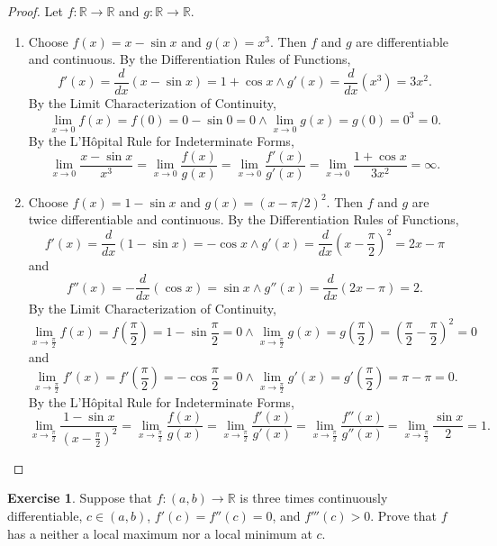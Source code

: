 \documentclass[12pt]{article}
\theoremstyle{definition}
\newtheorem{exercise}{Exercise}
\begin{document}
\begin{proof}
    Let \(f : \mathbb{R} \to \mathbb{R}\) and \(g : \mathbb{R} \to \mathbb{R}\).
    \begin{enumerate}[label=(\alph*)]
        \item Choose \(f(x) = x - \sin x\) and \(g(x) = x^3\). Then \(f\) and \(g\) are differentiable and continuous. By the Differentiation Rules of Functions,
        \[
            f'(x) = \frac{d}{dx}(x - \sin x) = 1 + \cos x \land g'(x) = \frac{d}{dx}(x^3) = 3x^2.
        \]
        By the Limit Characterization of Continuity,
        \[
            \lim_{x \to 0}f(x) = f(0) = 0 - \sin 0 = 0 \land \lim_{x \to 0}g(x) = g(0) = 0^3 = 0. 
        \]
        By the L'Hôpital Rule for Indeterminate Forms,
        \[
            \lim_{x \to 0}\frac{x - \sin x}{x^3} = \lim_{x \to 0}\frac{f(x)}{g(x)} = \lim_{x \to 0}\frac{f'(x)}{g'(x)} = \lim_{x \to 0}\frac{1 + \cos x}{3x^2} = \infty.
        \]
        \item Choose \(f(x) = 1 - \sin x\) and \(g(x) = (x - \pi/2)^2\). Then \(f\) and \(g\) are twice differentiable and continuous. By the Differentiation Rules of Functions,
        \[
            f'(x) = \frac{d}{dx}(1 - \sin x) = -\cos x \land g'(x) = \frac{d}{dx}\left(x - \frac{\pi}{2}\right)^2 = 2x - \pi
        \]
        and 
        \[
            f''(x) = -\frac{d}{dx}(\cos x) = \sin x \land g''(x) = \frac{d}{dx}(2x - \pi) = 2.
        \]
        By the Limit Characterization of Continuity,
        \[
            \lim_{x \to \frac{\pi}{2}}f(x) = f\left(\frac{\pi}{2}\right) = 1 - \sin \frac{\pi}{2} = 0 \land \lim_{x \to \frac{\pi}{2}}g(x) = g\left(\frac{\pi}{2}\right) = \left(\frac{\pi}{2} - \frac{\pi}{2}\right)^2 = 0
        \]
        and 
        \[
            \lim_{x \to \frac{\pi}{2}}f'(x) = f'\left(\frac{\pi}{2}\right) = -\cos \frac{\pi}{2} = 0 \land \lim_{x \to \frac{\pi}{2}}g'(x) = g'\left(\frac{\pi}{2}\right) = \pi - \pi = 0.
        \]
        By the L'Hôpital Rule for Indeterminate Forms,
        \[
            \lim_{x \to \frac{\pi}{2}}\frac{1 - \sin x}{(x - \frac{\pi}{2})^2} = \lim_{x \to \frac{\pi}{2}}\frac{f(x)}{g(x)} = \lim_{x \to \frac{\pi}{2}}\frac{f'(x)}{g'(x)} = \lim_{x \to \frac{\pi}{2}}\frac{f''(x)}{g''(x)} = \lim_{x \to \frac{\pi}{2}}\frac{\sin x}{2} = 1.
        \]
    \end{enumerate}
\end{proof}

\begin{exercise}
    Suppose that \(f : (a, b) \to \mathbb{R}\) is three times continuously diﬀerentiable, \(c \in (a, b)\), \(f'(c) = f''(c) = 0\), and \(f'''(c) > 0\). Prove that \(f\) has a neither a local maximum nor a local minimum at \(c\).
\end{exercise}
\end{document}
